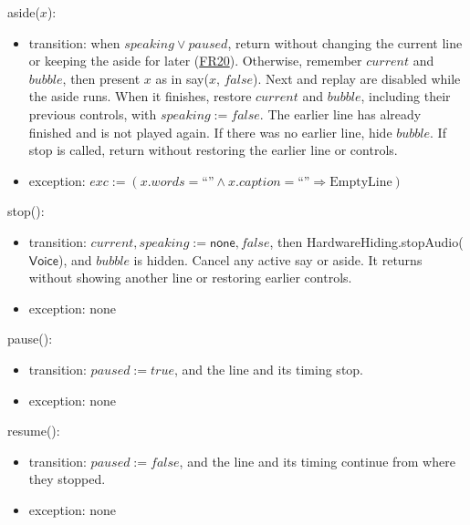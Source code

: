 \documentclass[10pt, titlepage]{article}
\newcommand{\srsurl}{https://team-hindsight.github.io/ophthamology-game/SRS/SRS.pdf}
\newcommand{\srsitemref}[2]{\href{\srsurl\#nameddest=#1}{#2}}
\newcommand{\T}[1]{\mathit{#1}}          %
\newcommand{\V}[1]{\mathsf{#1}}          %
\newcommand{\exc}{\mathit{exc}}
\newcommand{\true}{\mathit{true}}
\newcommand{\false}{\mathit{false}}
\begin{document}
\begin{samepage}
\noindent aside($x$):
\begin{itemize}
\item transition: when $\T{speaking} \vee \T{paused}$, return without
  changing the current line or keeping the aside for later
  (\srsitemref{FR_HoldSkip}{FR20}). Otherwise, remember $\T{current}$ and
  $\T{bubble}$, then present $x$ as in say($x$, $\false$). Next and replay
  are disabled while the aside runs. When it finishes, restore
  $\T{current}$ and $\T{bubble}$, including their previous controls, with
  $\T{speaking} := \false$. The earlier line has already finished and is
  not played again. If there was no earlier line, hide $\T{bubble}$.
  If stop is called, return without restoring the earlier line or controls.
\item exception: $\exc := (x.\T{words} = \text{``''} \wedge x.\T{caption} =
  \text{``''} \Rightarrow \text{EmptyLine})$
\end{itemize}
\end{samepage}
\par\pagebreak[0]

\begin{samepage}
\noindent stop():
\begin{itemize}
\item transition: $\T{current}, \T{speaking} := \V{none}, \false$,
  then HardwareHiding.stopAudio($\V{Voice}$), and $\T{bubble}$ is hidden.
  Cancel any active say or aside. It returns without showing another line
  or restoring earlier controls.
\item exception: none
\end{itemize}
\end{samepage}
\par\pagebreak[0]

\begin{samepage}
\noindent pause():
\begin{itemize}
\item transition: $\T{paused} := \true$, and the line and its timing stop.
\item exception: none
\end{itemize}
\end{samepage}
\par\pagebreak[0]

\begin{samepage}
\noindent resume():
\begin{itemize}
\item transition: $\T{paused} := \false$, and the line and its timing continue
  from where they stopped.
\item exception: none
\end{itemize}
\end{samepage}
\par\pagebreak[0]
\end{document}
